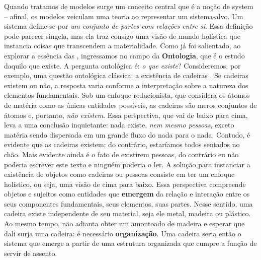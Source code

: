 \documentclass[./main.tex]{subfiles}
\begin{document}
\par Quando tratamos de modelos surge um conceito central que é a noção de \gls{system} – afinal, os modelos veiculam uma teoria ao representar um sistema-alvo. Um sistema define-se por \textit{um conjunto de partes com relações entre si}. Essa definição pode parecer singela, mas ela traz consigo uma visão de mundo holística que instancia coisas que transcendem a materialidade. Como já foi salientado, ao explorar a essência das , ingressamos no campo da \textbf{Ontologia}, que é o estudo daquilo que existe. A pergunta ontológica é: \textit{o que existe}? Consideremos, por exemplo, uma questão ontológica clássica: a existência de cadeiras \cite{bradley2019}. Se cadeiras existem ou não, a resposta varia conforme a interpretação sobre a natureza dos elementos fundamentais. Sob um enfoque reducionista, que considera os átomos de matéria como as únicas entidades possíveis, as cadeiras são meros conjuntos de átomos e, portanto, \textit{não existem}. Essa perspectiva, que vai de baixo para cima, leva a uma conclusão inquietante: nada existe, \textit{nem mesmo pessoas}, exceto matéria sendo dispersada em um grande fluxo do nada para o nada. Contudo, é evidente que as cadeiras existem; do contrário, estaríamos todos sentados no chão. Mais evidente ainda é o fato de existirem pessoas, do contrário eu não poderia escrever este texto e ninguém poderia o ler. A solução para instanciar a existência de objetos como cadeiras ou pessoas consiste em ter um enfoque holístico, ou seja, uma visão de cima para baixo. Essa perspectiva compreende objetos e sujeitos como entidades que \textbf{emergem} da relação e interação entre os seus componentes fundamentais, seus elementos, suas partes. Nesse sentido, uma cadeira existe independente de seu material, seja ele metal, madeira ou plástico. Ao mesmo tempo, não adianta obter um amontoado de madeira e esperar que dali surja uma cadeira: é necessário \textbf{organização}. Uma cadeira seria então o sistema que emerge a partir de uma estrutura organizada que cumpre a função de servir de assento.
\end{document}
